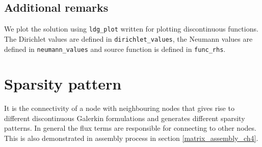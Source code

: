 \documentclass[a4paper]{book}
\begin{document}
\subsection{Additional remarks}

We plot the solution using  \verb|ldg_plot| written for plotting discontinuous functions. The Dirichlet values are defined in \verb|dirichlet_values|, the Neumann values are defined in \verb|neumann_values| and source function is defined in \verb|func_rhs|. 

\section{Sparsity pattern}

It is the connectivity of a node with neighbouring nodes that gives rise to different discontinuous Galerkin formulations and generates different sparsity patterns. In general the flux terms are responsible for connecting to other nodes. This is also demonstrated in assembly process in section \ref{matrix_assembly_ch4}. 
\end{document}

